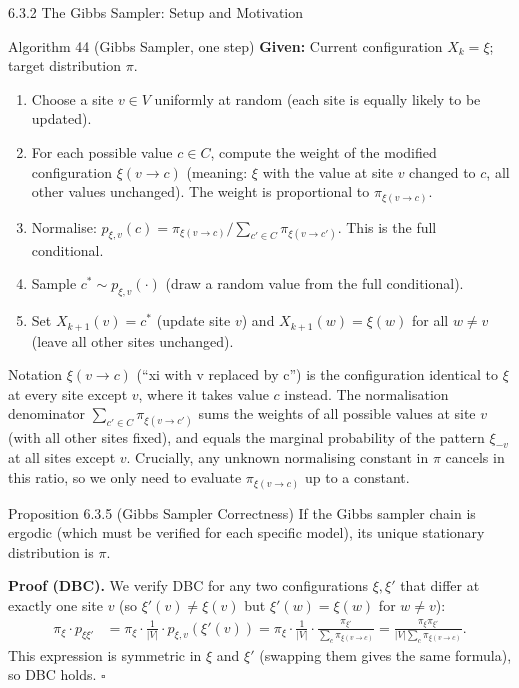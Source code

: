 \documentclass[aspectratio=169,10pt]{beamer}
\begin{document}
\begin{frame}[allowframebreaks]{6.3.2 The Gibbs Sampler: Setup and Motivation}
\begin{block}{Algorithm 44 (Gibbs Sampler, one step)}
\textbf{Given:} Current configuration $X_k = \xi$; target distribution $\pi$.
\begin{enumerate}
  \item Choose a site $v \in V$ uniformly at random (each site is equally likely to be updated).
  \item For each possible value $c \in C$, compute the weight of the modified configuration $\xi(v \to c)$ (meaning: $\xi$ with the value at site $v$ changed to $c$, all other values unchanged). The weight is proportional to $\pi_{\xi(v \to c)}$.
  \item Normalise: $p_{\xi,v}(c) = \pi_{\xi(v \to c)} / \sum_{c' \in C} \pi_{\xi(v \to c')}$. This is the full conditional.
  \item Sample $c^* \sim p_{\xi,v}(\cdot)$ (draw a random value from the full conditional).
  \item Set $X_{k+1}(v) = c^*$ (update site $v$) and $X_{k+1}(w) = \xi(w)$ for all $w \neq v$ (leave all other sites unchanged).
\end{enumerate}
\end{block}

\begin{block}{Notation}
$\xi(v \to c)$ (``xi with v replaced by c'') is the configuration identical to $\xi$ at every site except $v$, where it takes value $c$ instead.
The normalisation denominator $\sum_{c' \in C} \pi_{\xi(v \to c')}$ sums the weights of all possible values at site $v$ (with all other sites fixed), and equals the marginal probability of the pattern $\xi_{-v}$ at all sites except $v$.
Crucially, any unknown normalising constant in $\pi$ cancels in this ratio, so we only need to evaluate $\pi_{\xi(v \to c)}$ up to a constant.
\end{block}

\framebreak

\begin{block}{Proposition 6.3.5 (Gibbs Sampler Correctness)}
If the Gibbs sampler chain is ergodic (which must be verified for each specific model), its unique stationary distribution is $\pi$.
\end{block}

\textbf{Proof (DBC).} We verify DBC for any two configurations $\xi, \xi'$ that differ at exactly one site $v$ (so $\xi'(v) \neq \xi(v)$ but $\xi'(w) = \xi(w)$ for $w \neq v$):
\begin{align*}
  \pi_\xi \cdot p_{\xi\xi'} &= \pi_\xi \cdot \frac{1}{|V|} \cdot p_{\xi,v}(\xi'(v)) = \pi_\xi \cdot \frac{1}{|V|} \cdot \frac{\pi_{\xi'}}{\sum_{c} \pi_{\xi(v \to c)}} = \frac{\pi_\xi \pi_{\xi'}}{|V| \sum_{c} \pi_{\xi(v \to c)}}.
\end{align*}
This expression is symmetric in $\xi$ and $\xi'$ (swapping them gives the same formula), so DBC holds. $\square$


\end{frame}
\end{document}
